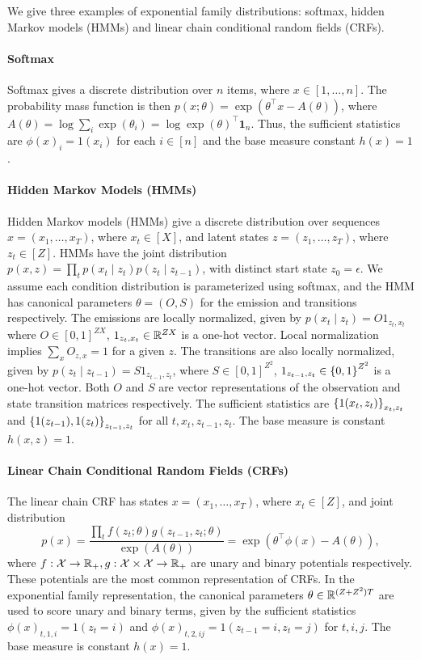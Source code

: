 \documentclass[11pt]{article}
\begin{document}
We give three examples of exponential family distributions:
softmax, hidden Markov models (HMMs)
and linear chain conditional random fields (CRFs).

\paragraph{Softmax}
Softmax gives a discrete distribution over $n$ items, where $x\in[1,\ldots,n]$.
The probability mass function is then $p(x;\theta) = \exp(\theta^\top x - A(\theta))$,
where $A(\theta) = \log \sum_i \exp(\theta_i) = \log \exp(\theta)^\top\mathbf{1}_n$.
Thus, the sufficient statistics are $\phi(x)_i = 1(x_i)$ for each $i\in[n]$ and
the base measure constant $h(x)=1$.

\paragraph{Hidden Markov Models (HMMs)}
Hidden Markov models (HMMs) give a discrete distribution over sequences $x = (x_1,\ldots,x_T)$,
where $x_t\in[X]$,
and latent states $z = (z_1,\ldots,z_T)$, where $z_t\in[Z]$.
HMMs have the joint distribution
$p(x,z) = \prod_t p(x_t\mid z_t)p(z_t\mid z_{t-1})$,
with distinct start state $z_0=\epsilon$.
We assume each condition distribution is parameterized using softmax,
and the HMM has canonical parameters $\theta = (O,S)$ for the emission and transitions respectively.
The emissions are locally normalized, given by $p(x_t\mid z_t) = O 1_{z_t,x_t}$
where $O\in[0,1]^{ZX}$, $1_{z_t,x_t}\in\mathbb{R}^{ZX}$ is a one-hot vector.
Local normalization implies $\sum_x O_{z,x}=1$ for a given $z$.
The transitions are also locally normalized, given by $p(z_t\mid z_{t-1}) = S 1_{z_{t-1},z_t}$,
where $S\in[0,1]^{Z^2}$, $1_{z_{t-1},z_t}\in\left\{0,1\right\}^{Z^2}$ is a one-hot vector.
Both $O$ and $S$ are vector representations of the observation and state transition
matrices respectively.
The sufficient statistics are $\left\{1(x_t,z_t)\right\}_{x_t,z_t}$
and $\left\{1(z_{t-1}),1(z_t)\right\}_{z_{t-1},z_t}$ for all $t,x_t,z_{t-1},z_t$.
The base measure is constant $h(x,z) = 1$.

\paragraph{Linear Chain Conditional Random Fields (CRFs)}
The linear chain CRF has states $x = (x_1,\ldots,x_T)$, where $x_t\in[Z]$,
and joint distribution
$$p(x) = \frac{\prod_t f(z_t; \theta)g(z_{t-1},z_t; \theta)}{\exp(A(\theta))}
= \exp(\theta^\top \phi(x) - A(\theta)),$$
where $f:\mathcal{X}\to\mathbb{R}_+,g:\mathcal{X}\times\mathcal{X}\to\mathbb{R}_+$ are unary and binary potentials respectively.
These potentials are the most common representation of CRFs.
In the exponential family representation,
the canonical parameters $\theta\in\mathbb{R}^{(Z + Z^2)T}$ are used to score unary and binary terms,
given by the sufficient statistics $\phi(x)_{t,1,i} = 1(z_t = i)$ and
$\phi(x)_{t,2,ij} = 1(z_{t-1} = i, z_t = j)$ for $t,i,j$.
The base measure is constant $h(x) = 1$.
\end{document}
